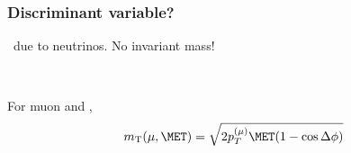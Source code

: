 \begin{frame}
\frametitle{Discriminant variable?}

\vfill

\begin{minipage}[c]{.3\textwidth}
\manip \MET\ due to neutrinos.
\manip No invariant mass!
\end{minipage}
\hfill
\begin{minipage}[c]{.45\textwidth}
\begin{center}

\end{center}
\end{minipage}
\hfill~

\vfill\pause

\begin{minipage}[c]{.55\textwidth}
\manip For muon and \MET,
\begin{equation*}
m_{\mathrm{T}}(\mu,\MET) = \sqrt{2p_T^{(\mu)} \MET (1-\cos\Delta\phi)}
\end{equation*}
\begin{center}
\end{center}
\end{minipage}
\qquad
\begin{minipage}[c]{.35\textwidth}
\begin{center}

\end{center}
\end{minipage}
\hfill

\vfill 

\end{frame}

